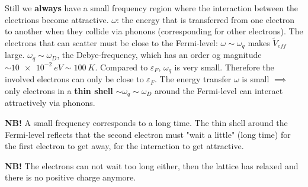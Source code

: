 Still we \textbf{always} have a small frequency region where the interaction between the electrions become attractive. $\omega$: the energy that is transferred from one electron to another when they collide via phonons (corresponding for other electrons). The electrons that can scatter must be close to the Fermi-level: $\omega\sim\omega_q$ makes $\tilde{V}_{eff}$ large. $\omega_q\sim\omega_D$, the Debye-frequency, which has an order og magnitude $\sim\SI{10e-2}{eV}\sim\SI{100}{K}$. Compared to $\varepsilon_F$, $\omega_q$ is very small. Therefore the involved electrons can only be close to $\varepsilon_F$. The energy transfer $\omega$ is small $\implies$ only electrons in a \textbf{thin shell} $\sim\omega_q\sim\omega_D$ around the Fermi-level can interact attractively via phonons.

\begin{Indentskip}
	\vspace*{-0.5\baselineskip}
	\textbf{NB!} A small frequency corresponds to a long time. The thin shell around the Fermi-level reflects that the second electron must "wait a little" (long time) for the first electron to get away, for the interaction to get attractive.
\end{Indentskip}
\begin{Indentskip}
	\vspace*{-0.5\baselineskip}
	\textbf{NB!} The electrons can not wait too long either, then the lattice has relaxed and there is no positive charge anymore.
\end{Indentskip}

